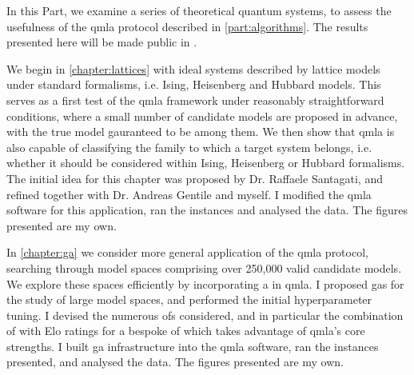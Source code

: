 \glsresetall
In this Part, we examine a series of theoretical quantum systems, 
    to assess the usefulness of the \gls{qmla} protocol described in \cref{part:algorithms}.
The results presented here will be made public in \cite{flynn2021Quantum}.
\par 
\vspace{1cm}

We begin in \cref{chapter:lattices} with ideal systems described by lattice models 
    under standard formalisms, i.e. Ising, Heisenberg and Hubbard models. 
This serves as a first test of the \gls{qmla} framework under reasonably straightforward
    conditions, where a small number of candidate models are proposed in advance, 
    with the \gls{true model} gauranteed to be among them. 
We then show that \gls{qmla} is also capable of classifying the family to which a target system belongs, 
    i.e. whether it should be considered within Ising, Heisenberg or Hubbard formalisms. 
The initial idea for this chapter was proposed by Dr. Raffaele Santagati, 
    and refined together with Dr. Andreas Gentile and myself. 
I modified the \gls{qmla} software for this application, 
    ran the \glspl{instance} and analysed the data. 
The figures presented are my own.

\par 
\vspace{1cm}
In \cref{chapter:ga} we consider more general application of the \gls{qmla} protocol, 
    searching through model spaces comprising over 250,000 valid candidate models. 
We explore these spaces efficiently by incorporating a  in \gls{qmla}. 
I proposed \glspl{ga} for the study of large model spaces, 
    and performed the initial \gls{hyperparameter} tuning. 
I devised the numerous \glspl{of} considered, 
    and in particular the combination of 
    with Elo ratings for a bespoke \gls{of} which takes advantage of \gls{qmla}'s core strengths. 
I built \gls{ga} infrastructure into the \gls{qmla} software, 
    ran the \glspl{instance} presented, and analysed the data.
The figures presented are my own. 
\par 